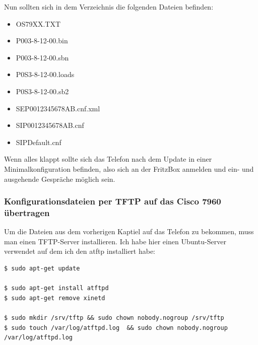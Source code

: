 \documentclass[a4paper,12pt]{scrbook}
\begin{document}
Nun sollten sich in dem Verzeichnis die folgenden Dateien befinden:
\begin{itemize}
 \item OS79XX.TXT  
 \item P003-8-12-00.bin  
 \item P003-8-12-00.sbn  
 \item P0S3-8-12-00.loads
 \item P0S3-8-12-00.sb2
 \item SEP0012345678AB.cnf.xml
 \item SIP0012345678AB.cnf
 \item SIPDefault.cnf
\end{itemize}
Wenn alles klappt sollte sich das Telefon nach dem Update in einer Minimalkonfiguration befinden, also sich an der FritzBox anmelden und ein- und ausgehende Gespräche möglich sein.

\subsubsection{Konfigurationsdateien per TFTP auf das Cisco 7960 übertragen}
Um die Dateien aus dem vorherigen Kaptiel auf das Telefon zu bekommen, muss man einen TFTP-Server installieren. 
Ich habe hier einen Ubuntu-Server verwendet auf dem ich den atftp installiert habe:

\begin{lstlisting}[caption={Installation von atftp unter ubuntu},label=lst:atftpdinstall]
$ sudo apt-get update

$ sudo apt-get install atftpd
$ sudo apt-get remove xinetd

$ sudo mkdir /srv/tftp && sudo chown nobody.nogroup /srv/tftp
$ sudo touch /var/log/atftpd.log  && sudo chown nobody.nogroup /var/log/atftpd.log
\end{lstlisting}
\end{document}
